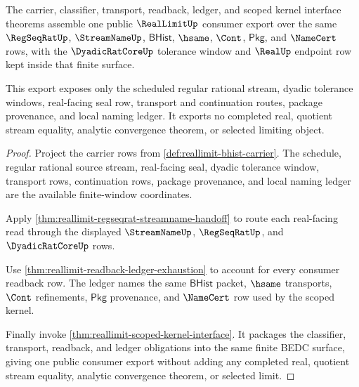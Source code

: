 \begin{theorem}
\label{thm:reallimit-public-real-window-export}
The carrier, classifier, transport, readback, ledger, and scoped kernel
interface theorems assemble one public $\RealLimitUp$ consumer export over the
same $\RegSeqRatUp$, $\StreamNameUp$, $\mathsf{BHist}$, $\hsame$, $\Cont$,
$\mathsf{Pkg}$, and $\NameCert$ rows, with the $\DyadicRatCoreUp$ tolerance
window and $\RealUp$ endpoint row kept inside that finite surface.

This export exposes only the scheduled regular rational stream, dyadic
tolerance windows, real-facing seal row, transport and continuation routes,
package provenance, and local naming ledger. It exports no completed real,
quotient stream equality, analytic convergence theorem, or selected limiting
object.
\end{theorem}
\begin{proof}
Project the carrier rows from \autoref{def:reallimit-bhist-carrier}. The
schedule, regular rational source stream, real-facing seal, dyadic tolerance
window, transport rows, continuation rows, package provenance, and local
naming ledger are the available finite-window coordinates.

Apply \autoref{thm:reallimit-regseqrat-streamname-handoff} to route each
real-facing read through the displayed $\StreamNameUp$, $\RegSeqRatUp$, and
$\DyadicRatCoreUp$ rows.

Use \autoref{thm:reallimit-readback-ledger-exhaustion} to account for every
consumer readback row. The ledger names the same $\mathsf{BHist}$ packet,
$\hsame$ transports, $\Cont$ refinements, $\mathsf{Pkg}$ provenance, and
$\NameCert$ row used by the scoped kernel.

Finally invoke \autoref{thm:reallimit-scoped-kernel-interface}. It packages
the classifier, transport, readback, and ledger obligations into the same
finite BEDC surface, giving one public consumer export without adding any
completed real, quotient stream equality, analytic convergence theorem, or
selected limit.
\end{proof}

